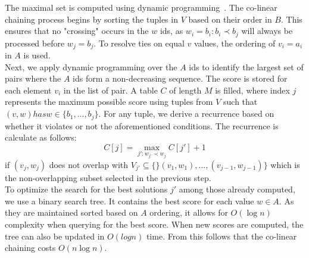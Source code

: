 The maximal set is computed using dynamic programming~\cite{genome_scale}.
The co-linear chaining process begins by sorting the tuples in $V$ based on their order in $B$. This ensures that no "crossing" occurs in the $w$ ids, as $w_i = b_i: b_i \prec b_j$ will always be processed before $w_j = b_j$. To resolve ties on equal $v$ values, the ordering of $v_i = a_i$ in $A$ is used.\\
Next, we apply dynamic programming over the $A$ ids to identify the largest set of pairs where the $A$ ids form a non-decreasing sequence. The score is stored for each element $v_i$ in the list of pair. A table $C$ of length $M$ is filled, where index $j$ represents the maximum possible score using tuples from $V$ such that $(v,w) has w \in \{b_1,...,b_j\}$. For any tuple, we derive a recurrence based on whether it violates or not the aforementioned conditions. The recurrence is calculate as follows: 
\begin{equation} 
C[j] = \max_{j':w_{j'} \prec w_j} C[j'] + 1
\end{equation}
if $(v_j,w_j)$ does not overlap with $ V_{j'} \subseteq \{\}(v_1,w_1),...,(v_{j-1},w_{j-1})\}$ which is the non-overlapping subset selected in the previous step.\\
To optimize the search for the best solutions $j'$ among those already computed, we use a binary search tree. It contains the best score for each value $w \in A$. As they are maintained sorted based on $A$ ordering, it allows for $O(\log{n})$ complexity when querying for the best score. When new scores are computed, the tree can also be updated in $O(log{n})$ time. From this follows that the co-linear chaining costs $O(n\log{n})$.

